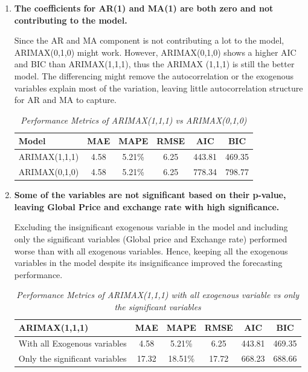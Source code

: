 \documentclass[11pt]{article}
\begin{document}
\begin{enumerate}
    \item \textbf{The coefficients for AR(1) and MA(1) are both zero and not contributing to the model. }
    
    Since the AR and MA component is not contributing a lot to the model, ARIMAX(0,1,0) might work. However, ARIMAX(0,1,0) shows a higher AIC and BIC than ARIMAX(1,1,1), thus the ARIMAX (1,1,1) is still the better model. The differencing might remove the autocorrelation or the exogenous variables explain most of the variation, leaving little autocorrelation structure for AR and MA to capture. 
    \begin{table}[H]
        \caption{\textit{Performance Metrics of ARIMAX(1,1,1) vs ARIMAX(0,1,0)}}
        \label{arimax010}
        \centering
        \begin{tabular}{lccccc}
            \toprule
            Model & MAE & MAPE & RMSE & AIC & BIC \\
            \midrule
            ARIMAX(1,1,1) & 4.58 & 5.21\% & 6.25 & 443.81 & 469.35 \\
            ARIMAX(0,1,0) & 4.58 & 5.21\% & 6.25 & 778.34 & 798.77 \\
            \bottomrule
        \end{tabular}
    \end{table}

    \item \textbf{Some of the variables are not significant based on their p-value, leaving Global Price and exchange rate with high significance.}

    Excluding the insignificant exogenous variable in the model and including only the significant variables (Global price and Exchange rate) performed worse than with all exogenous variables. Hence, keeping all the exogenous variables in the model despite its insignificance improved the forecasting performance. 

    \begin{table}[H]
        \caption{\textit{Performance Metrics of ARIMAX(1,1,1) with all exogenous variable vs only the significant variables}}
        \label{exog_significant}
        \centering
        \begin{tabular}{lccccc}
            \toprule
            ARIMAX(1,1,1) & MAE & MAPE & RMSE & AIC & BIC \\
            \midrule
            With all Exogenous variables & 4.58 & 5.21\% & 6.25 & 443.81 & 469.35 \\
            Only the significant variables & 17.32 & 18.51\% & 17.72 & 668.23 & 688.66 \\
            \bottomrule
        \end{tabular}
    \end{table}


\end{enumerate}
\end{document}

